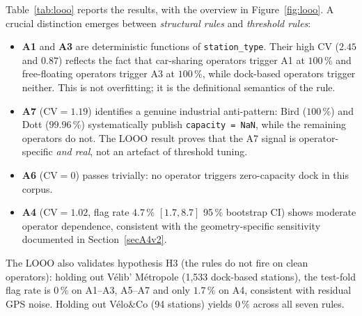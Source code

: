 \documentclass[11pt,a4paper]{article}
\begin{document}
Table~\ref{tab:looo} reports the results, with the overview in
Figure~\ref{fig:looo}. A crucial distinction
emerges between \emph{structural rules} and \emph{threshold rules}:
%
\begin{itemize}[nosep]
\item \textbf{A1} and \textbf{A3} are deterministic functions of
  \texttt{station\_type}. Their high CV ($2.45$ and $0.87$) reflects
  the fact that car-sharing operators trigger A1 at $100\,\%$ and
  free-floating operators trigger A3 at $100\,\%$, while dock-based
  operators trigger neither. This is not overfitting; it is the
  definitional semantics of the rule.
\item \textbf{A7} ($\mathrm{CV} = 1.19$) identifies a genuine
  industrial anti-pattern: Bird ($100\,\%$) and Dott ($99.96\,\%$)
  systematically publish \texttt{capacity = NaN}, while the
  remaining operators do not. The LOOO result proves that the A7
  signal is operator-specific \emph{and real}, not an artefact of
  threshold tuning.
\item \textbf{A6} ($\mathrm{CV} = 0$) passes trivially: no
  operator triggers zero-capacity dock in this corpus.
\item \textbf{A4} ($\mathrm{CV} = 1.02$, flag rate
  $4.7\,\%$ $[1.7, 8.7]$ 95\,\% bootstrap CI) shows moderate
  operator dependence, consistent with the geometry-specific
  sensitivity documented in Section~\ref{secA4v2}.
\end{itemize}
%
The LOOO also validates hypothesis H3 (the rules do not fire on
clean operators): holding out V\'elib' M\'etropole (1{,}533
dock-based stations), the test-fold flag rate is $0\,\%$ on A1--A3,
A5--A7 and only $1.7\,\%$ on A4, consistent with residual GPS noise.
Holding out V\'elo\&Co (94 stations) yields $0\,\%$ across all
seven rules.
\end{document}
